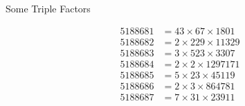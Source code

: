 \documentclass[20pt]{article}
\begin{document}

Some Triple Factors

\begin{align*}
5188681 &= 43 \times 67 \times 1801 \\
5188682 &= 2 \times 229 \times 11329 \\
5188683 &= 3 \times 523 \times 3307 \\
5188684 &= 2 \times 2 \times 1297171 \\
5188685 &= 5 \times 23 \times 45119 \\
5188686 &= 2 \times 3 \times 864781 \\
5188687 &= 7 \times 31 \times 23911
\end{align*}
\end{document}
